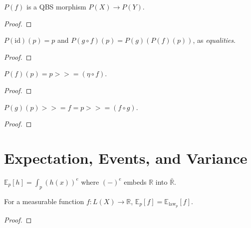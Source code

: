 \begin{lemma}\label{lem:qbs_map_morph}
  \rocqok
  $P(f)$ is a QBS morphism $P(X) \to P(Y)$.
\end{lemma}
\begin{proof}\rocqok\end{proof}

\begin{lemma}\label{lem:qbs_map_functor}
  \rocqok
  $P(\mathrm{id})(p) = p$ and $P(g \circ f)(p) = P(g)(P(f)(p))$,
  as \emph{equalities}.
\end{lemma}
\begin{proof}\rocqok\end{proof}

\begin{lemma}\label{lem:qbs_map_bind}
  \rocqok
  $P(f)(p) = p \mathbin{>\!\!>\!\!=} (\eta \circ f)$.
\end{lemma}
\begin{proof}\rocqok\end{proof}

\begin{lemma}\label{lem:qbs_bind_map}
  \rocqok
  $P(g)(p) \mathbin{>\!\!>\!\!=} f = p \mathbin{>\!\!>\!\!=} (f \circ g)$.
\end{lemma}
\begin{proof}\rocqok\end{proof}


\section{Expectation, Events, and Variance}\label{sec:expect_var}

\begin{definition}\label{def:qbs_expect}
  \rocqok
  $\mathbb{E}_p[h] = \int_p (h(x))^{e}$ where $(-)^{e}$
  embeds $\mathbb{R}$ into $\bar{\mathbb{R}}$.
\end{definition}

\begin{lemma}\label{lem:qbs_expectE}
  \rocqok
  For a measurable function $f : L(X) \to \mathbb{R}$,
  $\mathbb{E}_p[f] = \mathbb{E}_{\mathrm{law}_p}[f]$.
\end{lemma}
\begin{proof}\rocqok\end{proof}

